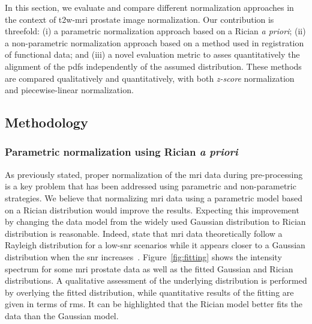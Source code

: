 In this section, we evaluate and compare different normalization approaches in the context of \ac{t2w}-\ac{mri} prostate image normalization.
Our contribution is threefold: (i) a parametric normalization approach based on a Rician \textit{a priori}; (ii) a non-parametric normalization approach based on a method used in registration of functional data; and (iii) a novel evaluation metric to asses quantitatively the alignment of the \acp{pdf} independently of the assumed distribution. 
These methods are compared qualitatively and quantitatively, with both \textit{z-score} normalization and piecewise-linear normalization.

\subsection{Methodology}\label{subsec:chp5:T2-norm:meth}

\subsubsection{Parametric normalization using Rician \textit{a priori}}\label{subsubsec:chp5:T2-norm:meth:rician}
As previously stated, proper normalization of the \ac{mri} data during pre-processing is a key problem that has been addressed using parametric and non-parametric strategies.
We believe that normalizing \ac{mri} data using a parametric model based on a Rician distribution would improve the results.
Expecting this improvement by changing the data model from the widely used Gaussian distribution to Rician distribution is reasonable.
Indeed, \citeauthor{Bernstein1989} state that \ac{mri} data theoretically follow a Rayleigh distribution for a low-\ac{snr} scenarios while it appears closer to a Gaussian distribution when the \ac{snr} increases~\citeauthor{Bernstein1989}.
Figure~\ref{fig:fitting} shows the intensity spectrum for some \ac{mri} prostate data as well as the fitted Gaussian and Rician distributions.
A qualitative assessment of the underlying distribution is performed by overlying the fitted distribution, while quantitative results of the fitting are given in terms of \ac{rms}.
It can be highlighted that the Rician model better fits the data than the Gaussian model.


